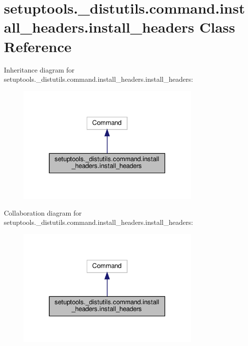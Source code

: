 \hypertarget{classsetuptools_1_1__distutils_1_1command_1_1install__headers_1_1install__headers}{}\section{setuptools.\+\_\+distutils.\+command.\+install\+\_\+headers.\+install\+\_\+headers Class Reference}
\label{classsetuptools_1_1__distutils_1_1command_1_1install__headers_1_1install__headers}


Inheritance diagram for setuptools.\+\_\+distutils.\+command.\+install\+\_\+headers.\+install\+\_\+headers\+:
\nopagebreak
\begin{figure}[H]
\begin{center}
\leavevmode
\includegraphics[width=258pt]{classsetuptools_1_1__distutils_1_1command_1_1install__headers_1_1install__headers__inherit__graph}
\end{center}
\end{figure}


Collaboration diagram for setuptools.\+\_\+distutils.\+command.\+install\+\_\+headers.\+install\+\_\+headers\+:
\nopagebreak
\begin{figure}[H]
\begin{center}
\leavevmode
\includegraphics[width=258pt]{classsetuptools_1_1__distutils_1_1command_1_1install__headers_1_1install__headers__coll__graph}
\end{center}
\end{figure}
